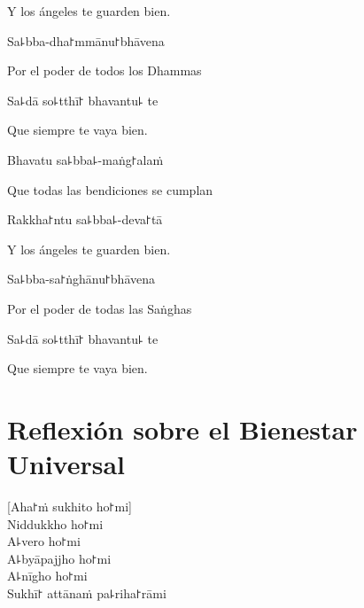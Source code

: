 \begin{english}
  Y los ángeles te guarden bien.
\end{english}

Sa꜕bba-dha꜓mmānu꜓bhāvena

\begin{english}
  Por el poder de todos los Dhammas
\end{english}

Sa꜕dā so꜕tthī꜓ bhavantu꜕ te

\begin{english}
  Que siempre te vaya bien.
\end{english}

Bhavatu sa꜕bba꜕-maṅg꜓alaṁ

\begin{english}
  Que todas las bendiciones se cumplan
\end{english}

Rakkha꜓ntu sa꜕bba꜕-deva꜓tā

\begin{english}
  Y los ángeles te guarden bien.
\end{english}

Sa꜕bba-sa꜓ṅghānu꜓bhāvena

\begin{english}
  Por el poder de todas las Saṅghas
\end{english}

Sa꜕dā so꜕tthī꜓ bhavantu꜕ te

\begin{english}
  Que siempre te vaya bien.
\end{english}

\chapter*[Bienestar Universal]{Reflexión sobre el Bienestar Universal}

\delegateSetUseNext


\begin{leader}
\end{leader}

[Aha꜓ṁ sukhito ho꜓mi]\\
Niddukkho ho꜓mi\\
A꜕vero ho꜓mi\\
A꜕byāpajjho ho꜓mi\\
A꜕nīgho ho꜓mi\\
Sukhī꜓ attānaṁ pa꜕riha꜓rāmi

